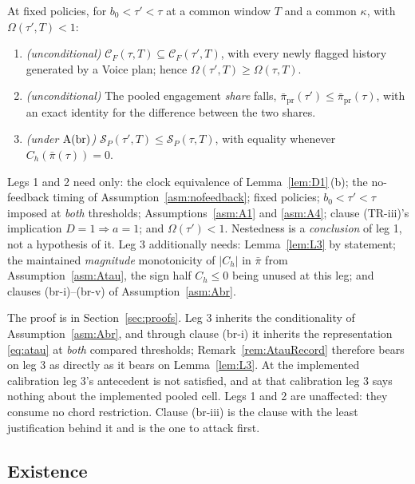 \begin{lemma}
\label{lem:L4}
At fixed policies, for $b_0 < \tau' < \tau$ at a common window $T$ and a common $\kappa$, with
$\Omega(\tau',T) < 1$:
\begin{enumerate}[label=(leg \arabic*),leftmargin=3.4em,itemsep=3pt]
\item \emph{(unconditional)} $\mathcal C_F(\tau,T) \subseteq \mathcal C_F(\tau',T)$, with every newly
  flagged history generated by a Voice plan; hence $\Omega(\tau',T) \ge \Omega(\tau,T)$.
\item \emph{(unconditional)} The pooled engagement \emph{share} falls,
  $\bar\pi_{\mathrm{pr}}(\tau') \le \bar\pi_{\mathrm{pr}}(\tau)$, with an exact identity for the
  difference between the two shares.
\item \emph{(under $\mathrm{A}(\mathrm{br})$)} $\mathcal S_P(\tau',T) \le \mathcal S_P(\tau,T)$, with equality whenever
  $C_h(\bar\pi(\tau)) = 0$.
\end{enumerate}
Legs 1 and 2 need only: the clock equivalence of Lemma~\ref{lem:D1}\,(b); the no-feedback timing of
Assumption~\ref{asm:nofeedback}; fixed policies; $b_0 < \tau' < \tau$ imposed at \emph{both}
thresholds; Assumptions~\ref{asm:A1} and \ref{asm:A4}; clause (TR-iii)'s implication
$D = 1 \Rightarrow a = 1$; and $\Omega(\tau') < 1$. Nestedness is a \emph{conclusion} of leg 1, not a
hypothesis of it. Leg 3 additionally needs: Lemma~\ref{lem:L3} by statement; the maintained
\emph{magnitude} monotonicity of $|C_h|$ in $\bar\pi$ from Assumption~\ref{asm:Atau}, the sign half
$C_h \le 0$ being unused at this leg; and clauses (br-i)--(br-v) of Assumption~\ref{asm:Abr}.
\end{lemma}

The proof is in Section~\ref{sec:proofs}. Leg 3 inherits the conditionality of
Assumption~\ref{asm:Abr}, and through clause (br-i) it inherits the representation \eqref{eq:atau} at
\emph{both} compared thresholds; Remark~\ref{rem:AtauRecord} therefore bears on leg 3 as directly as
it bears on Lemma~\ref{lem:L3}. At the implemented calibration leg 3's antecedent is not satisfied,
and at that calibration leg 3 says nothing about the implemented pooled cell. Legs 1 and 2 are
unaffected: they consume no chord restriction. Clause (br-iii) is the clause with the least
justification behind it and is the one to attack first.

\subsection{Existence}
\label{sec:existence-results}

